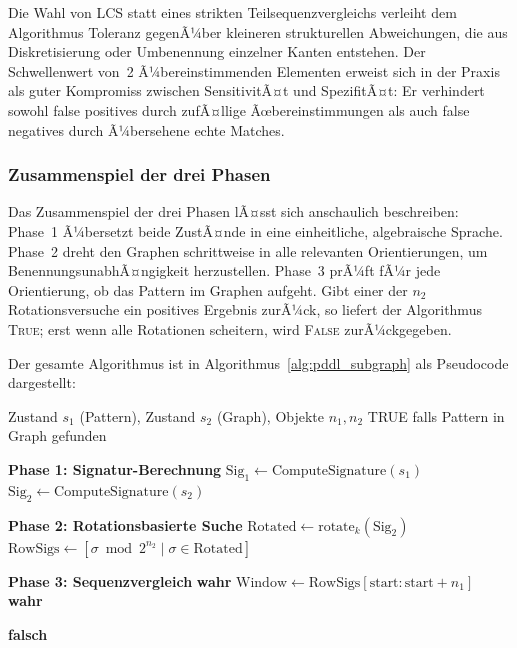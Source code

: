 ﻿\documentclass[a4paper,12pt]{article}
\theoremstyle{definition}
\begin{document}
Die Wahl von LCS statt eines strikten Teilsequenzvergleichs verleiht dem Algorithmus Toleranz gegenÃ¼ber kleineren strukturellen Abweichungen, die aus Diskretisierung oder Umbenennung einzelner Kanten entstehen. Der Schwellenwert von~2 Ã¼bereinstimmenden Elementen erweist sich in der Praxis als guter Kompromiss zwischen SensitivitÃ¤t und SpezifitÃ¤t: Er verhindert sowohl false positives durch zufÃ¤llige Ãœbereinstimmungen als auch false negatives durch Ã¼bersehene echte Matches.

\subsubsection*{Zusammenspiel der drei Phasen}

Das Zusammenspiel der drei Phasen lÃ¤sst sich anschaulich beschreiben: Phase~1 Ã¼bersetzt beide ZustÃ¤nde in eine einheitliche, algebraische Sprache. Phase~2 dreht den Graphen schrittweise in alle relevanten Orientierungen, um BenennungsunabhÃ¤ngigkeit herzustellen. Phase~3 prÃ¼ft fÃ¼r jede Orientierung, ob das Pattern im Graphen aufgeht. Gibt einer der $n_2$ Rotationsversuche ein positives Ergebnis zurÃ¼ck, so liefert der Algorithmus \textsc{True}; erst wenn alle Rotationen scheitern, wird \textsc{False} zurÃ¼ckgegeben.

Der gesamte Algorithmus ist in Algorithmus~\ref{alg:pddl_subgraph} als Pseudocode dargestellt:

\begin{algorithm}[H]
	\caption{Subgraph-Matching fÃ¼r PDDL-ZustÃ¤nde}
	\label{alg:pddl_subgraph}
	\begin{algorithmic}[1]
		\Eingabe Zustand $s_1$ (Pattern), Zustand $s_2$ (Graph), Objekte $n_1, n_2$
		\Ausgabe TRUE falls Pattern in Graph gefunden
		
		\State \textbf{Phase 1: Signatur-Berechnung}
		\State $\text{Sig}_1 \gets \text{ComputeSignature}(s_1)$ 
		\State $\text{Sig}_2 \gets \text{ComputeSignature}(s_2)$ 
		
		\State \textbf{Phase 2: Rotationsbasierte Suche}
		 
		\State $\text{Rotated} \gets \text{rotate}_k(\text{Sig}_2)$
		\State $\text{RowSigs} \gets [\sigma \bmod 2^{n_2} \mid \sigma \in \text{Rotated}]$ 
		
		\State \textbf{Phase 3: Sequenzvergleich}
		 
		\State \Return \textbf{wahr}
		\EndeWenn
		\Sonst
		 
		\State $\text{Window} \gets \text{RowSigs}[\text{start}:\text{start}+n_1]$
		 
		\State \Return \textbf{wahr}
		\EndeWenn
		\EndeFuer
		\EndeWenn
		\EndeFuer
		
		\State \Return \textbf{falsch}
	\end{algorithmic}
\end{algorithm}
\end{document}
